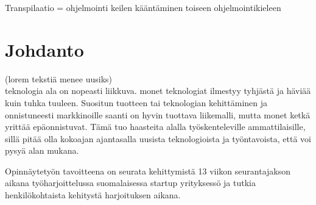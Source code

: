 \documentclass[11pt,a4paper,titlepage,oneside]{article}
\begin{document}
Transpilaatio = ohjelmointi keilen kääntäminen toiseen ohjelmointikieleen
\bigskip



\newpage





\clearpage
\setcounter{page}{1}

\pagestyle{fancy}
\lfoot{}
\cfoot{}
\rfoot{}
\lhead{}
\chead{}
\rhead{\thepage}
\renewcommand{\headrulewidth}{0pt}
\renewcommand{\footrulewidth}{0pt}


\section{Johdanto}              %






(lorem tekstiä menee uusiks)\\
teknologia ala on nopeasti liikkuva. monet teknologiat ilmestyy tyhjästä ja häviää kuin tuhka tuuleen.
Suositun tuotteen tai teknologian kehittäminen ja onnistuneesti markkinoille saanti on hyvin tuottava liikemalli, 
mutta monet ketkä yrittää epäonnistuvat.
Tämä tuo haasteita alalla työskenteleville ammattilaisille, 
sillä pitää olla kokoajan ajantasalla uusista teknologioista ja työntavoista, että voi pysyä alan mukana.
\medskip


Opinnäytetyön tavoitteena on seurata kehittymistä 13 viikon seurantajakson aikana työharjoittelussa suomalaisessa startup yrityksessö
ja tutkia henkilökohtaista kehitystä harjoituksen aikana.
\medskip
\end{document}
